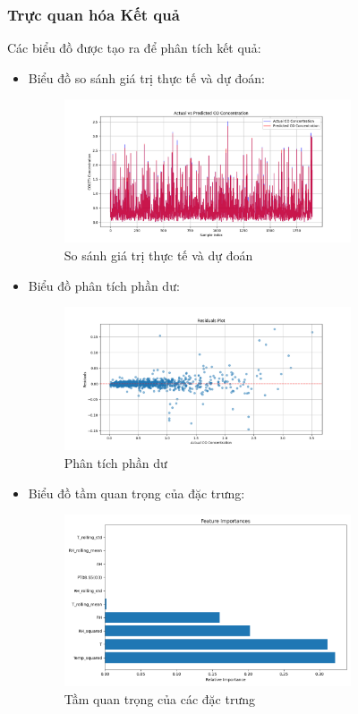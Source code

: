 \subsubsection{Trực quan hóa Kết quả}
Các biểu đồ được tạo ra để phân tích kết quả:
\begin{itemize}
    \item Biểu đồ so sánh giá trị thực tế và dự đoán:
    \begin{figure}[H]
        \centering
        \includegraphics[width=0.8\textwidth]{images/random_forest/predictions_comparison.png}
        \caption{So sánh giá trị thực tế và dự đoán}
        \label{fig:predictions}
    \end{figure}
    
    \item Biểu đồ phân tích phần dư:
    \begin{figure}[H]
        \centering
        \includegraphics[width=0.8\textwidth]{images/random_forest/residuals_plot.png}
        \caption{Phân tích phần dư}
        \label{fig:residuals}
    \end{figure}
    
    \item Biểu đồ tầm quan trọng của đặc trưng:
    \begin{figure}[H]
        \centering
        \includegraphics[width=0.8\textwidth]{images/random_forest/feature_importance.png}
        \caption{Tầm quan trọng của các đặc trưng}
        \label{fig:importance}
    \end{figure}
\end{itemize}

